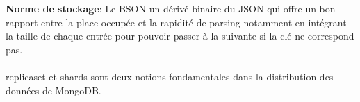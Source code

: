 \noindent \textbf{Norme de stockage}: Le \textsf{BSON} un dérivé binaire du \textsf{JSON} qui offre un bon rapport entre la place occupée et la rapidité de parsing notamment en intégrant la taille de chaque entrée pour pouvoir passer à la suivante si la clé ne correspond pas.
\\
\\
\textsf{replicaset et shards} sont deux notions fondamentales dans la distribution des données de MongoDB.
